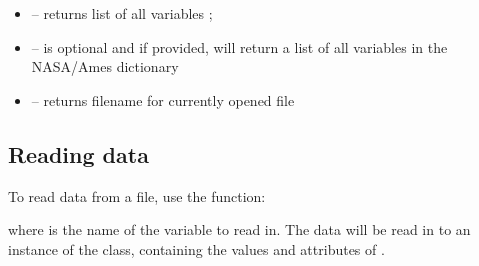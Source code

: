 \documentclass[a4paper,10pt,openany,english]{sphinxmanual}
\begin{document}
\begin{itemize}
\item {} 
 -- returns list of all variables ;

\item {} 
 --  is optional and if provided, will return a list of all variables in the NASA/Ames dictionary 

\item {} 
 -- returns filename for currently opened file

\end{itemize}


\subsection{Reading data}
\label{tutorial:id15}
To read data from a file, use the  function:

\begin{sphinxVerbatim}[commandchars=\\\{\}]
  
\end{sphinxVerbatim}

where  is the name of the variable to read in. The data will be read in to an instance of the {\hyperref[egadsapi:egads.core.egads_core.EgadsData]{}} class, containing the values and attributes of .
\end{document}
